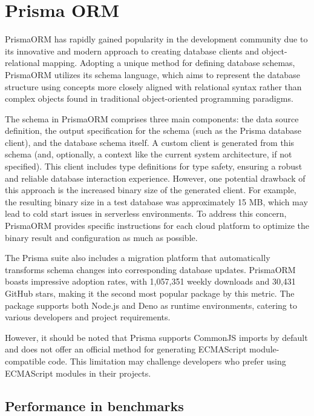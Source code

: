 \section{Prisma ORM}

PrismaORM has rapidly gained popularity in the development community due to its
innovative and modern approach to creating database clients and
object-relational mapping. Adopting a unique method for defining database
schemas, PrismaORM utilizes its schema language, which aims to represent the
database structure using concepts more closely aligned with relational syntax
rather than complex objects found in traditional object-oriented programming
paradigms.

The schema in PrismaORM comprises three main components: the data source
definition, the output specification for the schema (such as the Prisma database
client), and the database schema itself. A custom client is generated from this
schema (and, optionally, a context like the current system architecture, if not
specified). This client includes type definitions for type safety, ensuring a
robust and reliable database interaction experience. However, one potential
drawback of this approach is the increased binary size of the generated client.
For example, the resulting binary size in a test database was approximately 15
MB, which may lead to cold start issues in serverless environments. To address
this concern, PrismaORM provides specific instructions for each cloud platform
to optimize the binary result and configuration as much as possible.

The Prisma suite also includes a migration platform that automatically
transforms schema changes into corresponding database updates. PrismaORM boasts
impressive adoption rates, with 1,057,351 weekly downloads and 30,431 GitHub
stars, making it the second most popular package by this metric. The package
supports both Node.js and Deno as runtime environments, catering to various
developers and project requirements.

However, it should be noted that Prisma supports CommonJS imports by default and
does not offer an official method for generating ECMAScript module-compatible
code. This limitation may challenge developers who prefer using ECMAScript
modules in their projects.

\subsection*{Performance in benchmarks}

